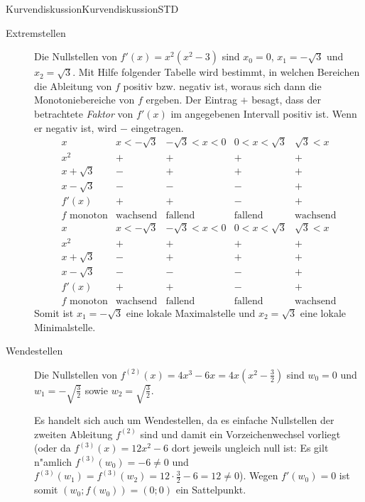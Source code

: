 \begin{MXContent}{Kurvendiskussion}{Kurvendiskussion}{STD}
\begin{MExample}
\begin{description}
\item[Extremstellen]
Die Nullstellen von $f'(x) = x^2 (x^2 - 3)$ sind $x_0 = 0$, $x_1 = -\sqrt{3}$ 
und $x_2 = \sqrt{3}$.
Mit Hilfe folgender Tabelle wird bestimmt, in welchen Bereichen die Ableitung 
von $f$ positiv bzw. negativ ist, woraus sich dann die Monotoniebereiche von 
$f$ ergeben. Der Eintrag $+$ besagt, dass der betrachtete \emph{Faktor} von 
$f'(x)$ im angegebenen Intervall positiv ist. Wenn er negativ ist, wird $-$ 
eingetragen.
\ifttm
\[
\begin{array}{ccccc}
x & x < -\sqrt{3} & -\sqrt{3} < x < 0 & 0 < x < \sqrt{3} & \sqrt{3} < x  \\
\hline
x^2          & + & + & + & + \\
x + \sqrt{3} & - & + & + & + \\
x - \sqrt{3} & - & - & - & + \\
f'(x)        & + & + & - & + \\
f \mbox{\ monoton} & \mbox{wachsend} & \mbox{fallend} & \mbox{fallend} & \mbox{wachsend} %
\end{array}
\]
\else
\[
\begin{array}{ccccc}
x & x < -\sqrt{3} & -\sqrt{3} < x < 0 & 0 < x < \sqrt{3} & \sqrt{3} < x  \\
\hline
x^2          & + & + & + & + \\
x + \sqrt{3} & - & + & + & + \\
x - \sqrt{3} & - & - & - & + \\
f'(x)        & + & + & - & + \\
f \text{ monoton} & \text{wachsend} & \text{fallend} & \text{fallend} & \text{wachsend} %
\end{array}
\]
\fi
Somit ist $x_1 = -\sqrt{3}$ eine lokale Maximalstelle und $x_2 = \sqrt{3}$ eine
lokale Minimalstelle.

\item[Wendestellen]
Die Nullstellen von 
$f^{(2)}(x) = 4 x^3 - 6 x = 4 x \left(x^2 - \frac{3}{2}\right)$
sind $w_0 = 0$ und $w_1 = -\sqrt{\frac{3}{2}}$ sowie
$w_2 = \sqrt{\frac{3}{2}}$.

Es handelt sich auch um Wendestellen, da es einfache Nullstellen der zweiten
Ableitung $f^{(2)}$ sind und damit ein Vorzeichenwechsel vorliegt 
(oder da $f^{(3)}(x) = 12 x^2 - 6$ dort jeweils ungleich null ist: Es gilt 
n"amlich $f^{(3)}(w_0) = - 6 \neq 0$ und
$f^{(3)}(w_1) = f^{(3)}(w_2) = 12 \cdot \frac{3}{2} - 6 = 12 \neq 0$).
Wegen $f'(w_0) = 0$ ist somit $(w_0; f(w_0)) = (0; 0)$ ein Sattelpunkt.


\end{description}
\end{MExample}
\end{MXContent}
